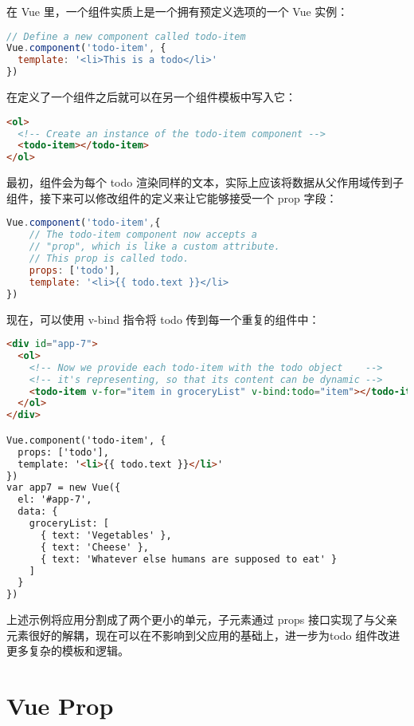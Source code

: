 在 Vue 里，一个组件实质上是一个拥有预定义选项的一个 Vue 实例：


\begin{lstlisting}[language=JavaScript]
// Define a new component called todo-item
Vue.component('todo-item', {
  template: '<li>This is a todo</li>'
})
\end{lstlisting}

在定义了一个组件之后就可以在另一个组件模板中写入它：

\begin{lstlisting}[language=HTML]
<ol>
  <!-- Create an instance of the todo-item component -->
  <todo-item></todo-item>
</ol>
\end{lstlisting}

最初，组件会为每个 todo 渲染同样的文本，实际上应该将数据从父作用域传到子组件，接下来可以修改组件的定义来让它能够接受一个 prop 字段：


\begin{lstlisting}[language=JavaScript]
Vue.component('todo-item',{
    // The todo-item component now accepts a
    // "prop", which is like a custom attribute.
    // This prop is called todo.
    props: ['todo'],
    template: '<li>{{ todo.text }}</li>
})
\end{lstlisting}

现在，可以使用 v-bind 指令将 todo 传到每一个重复的组件中：



\begin{lstlisting}[language=HTML]
<div id="app-7">
  <ol>
    <!-- Now we provide each todo-item with the todo object    -->
    <!-- it's representing, so that its content can be dynamic -->
    <todo-item v-for="item in groceryList" v-bind:todo="item"></todo-item>
  </ol>
</div>

Vue.component('todo-item', {
  props: ['todo'],
  template: '<li>{{ todo.text }}</li>'
})
var app7 = new Vue({
  el: '#app-7',
  data: {
    groceryList: [
      { text: 'Vegetables' },
      { text: 'Cheese' },
      { text: 'Whatever else humans are supposed to eat' }
    ]
  }
})
\end{lstlisting}


上述示例将应用分割成了两个更小的单元，子元素通过 props 接口实现了与父亲元素很好的解耦，现在可以在不影响到父应用的基础上，进一步为todo 组件改进更多复杂的模板和逻辑。

\chapter{Vue Prop}


